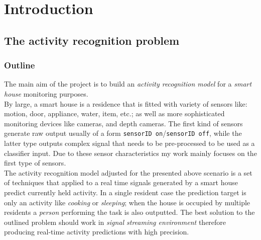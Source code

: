 \documentclass[10pt, a4paper, pdflatex, leqno, twoside, openright]{report}
\begin{document}
\chapter{Introduction\label{ch:introduction}} %
\setcounter{page}{1}

  \section{The activity recognition problem}
    \subsection{Outline} %
The main aim of the project is to build an \emph{activity recognition model} for a \emph{smart house} monitoring purposes.\\

By large, a smart house is a residence that is fitted with variety of sensors like: motion, door, appliance, water, item, etc.; as well as more sophisticated monitoring devices like cameras, and depth cameras. The first kind of sensors generate raw output usually of a form \texttt{sensorID on}/\texttt{sensorID off}, while the latter type outputs complex signal that needs to be pre-processed to be used as a classifier input. Due to these sensor characteristics my work mainly focuses on the first type of sensors.\\

The activity recognition model adjusted for the presented above scenario is a set of techniques that applied to a real time signals generated by a smart house predict currently held activity. In a single resident case the prediction target is only an activity like \emph{cooking} or \emph{sleeping}; when the house is occupied by multiple residents a \emph{person} performing the task is also outputted. The best solution to the outlined problem should work in \emph{signal streaming environment} therefore producing real-time activity predictions with high precision.
\end{document}
